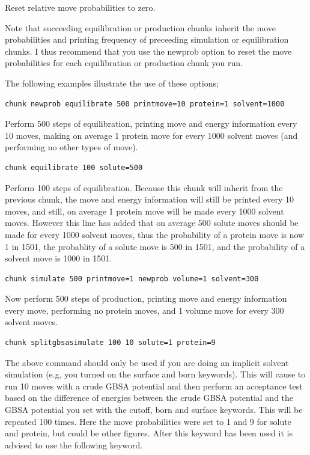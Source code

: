 \documentclass[letterpaper,10pt,english]{sphinxmanual}
\begin{document}
Reset relative move probabilities to zero.

Note that succeeding equilibration or production chunks inherit the move probabilities and printing frequency of preceeding simulation or equilibration chunks. I thus recommend that you use the newprob option to reset the move probabilities for each equilibration or production chunk you run.

The following examples illustrate the use of these options;

\begin{Verbatim}[commandchars=\\\{\}]
chunk newprob equilibrate 500 printmove=10 protein=1 solvent=1000
\end{Verbatim}

Perform 500 steps of equilibration, printing move and energy information every 10 moves, making on average 1 protein move for every 1000 solvent moves (and performing no other types of move).

\begin{Verbatim}[commandchars=\\\{\}]
chunk equilibrate 100 solute=500
\end{Verbatim}

Perform 100 steps of equilibration. Because this chunk will inherit from the previous chunk, the move and energy information will still be printed every 10 moves, and still, on average 1 protein move will be made every 1000 solvent moves. However this line has added that on average 500 solute moves should be made for every 1000 solvent moves, thus the probability of a protein move is now 1 in 1501, the probablity of a solute move is 500 in 1501, and the probability of a solvent move is 1000 in 1501.

\begin{Verbatim}[commandchars=\\\{\}]
chunk simulate 500 printmove=1 newprob volume=1 solvent=300
\end{Verbatim}

Now perform 500 steps of production, printing move and energy information every move, performing no protein moves, and 1 volume move for every 300 solvent moves.

\begin{Verbatim}[commandchars=\\\{\}]
chunk splitgbsasimulate 100 10 solute=1 protein=9
\end{Verbatim}

The above command should only be used if you are doing an implicit solvent simulation (e.g, you turned on the surface and born keywords). This will cause to run 10 moves with a crude GBSA potential and then perform an acceptance test based on the difference of energies between the crude GBSA potential and the GBSA potential you set with the cutoff, born and surface keywords. This will be repeated 100 times. Here the move probabilities were set to 1 and 9 for solute and protein, but could be other figures. After this keyword has been used it is advised to use the following keyword.
\end{document}
